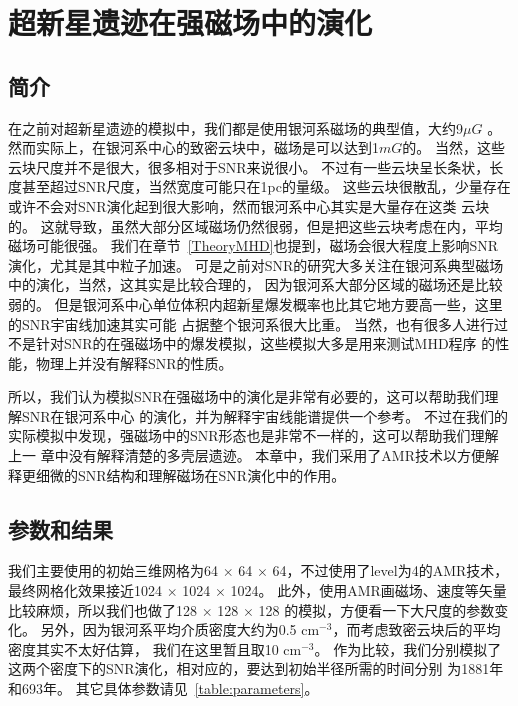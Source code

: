 \chapter{超新星遗迹在强磁场中的演化}
\label{Mag}

\section{简介}
\label{MagIntro}

在之前对超新星遗迹的模拟中，我们都是使用银河系磁场的典型值，大约9$\mu G$
\citep{Crutcher2012,Haverkorn2015}。
然而实际上，在银河系中心的致密云块中，磁场是可以达到1$mG$的\citep{Ferriere2009}。
当然，这些云块尺度并不是很大，很多相对于SNR来说很小。
不过有一些云块呈长条状，长度甚至超过SNR尺度，当然宽度可能只在1pc的量级。
这些云块很散乱，少量存在或许不会对SNR演化起到很大影响，然而银河系中心其实是大量存在这类
云块的。
这就导致，虽然大部分区域磁场仍然很弱，但是把这些云块考虑在内，平均磁场可能很强。
我们在章节~\ref{TheoryMHD}也提到，磁场会很大程度上影响SNR演化，尤其是其中粒子加速。
可是之前对SNR的研究大多关注在银河系典型磁场中的演化，当然，这其实是比较合理的，
因为银河系大部分区域的磁场还是比较弱的。
但是银河系中心单位体积内超新星爆发概率也比其它地方要高一些，这里的SNR宇宙线加速其实可能
占据整个银河系很大比重。
当然，也有很多人进行过不是针对SNR的在强磁场中的爆发模拟，这些模拟大多是用来测试MHD程序
的性能，物理上并没有解释SNR的性质\citep{Balsara1999, Stone2009, Barnes2018}。

所以，我们认为模拟SNR在强磁场中的演化是非常有必要的，这可以帮助我们理解SNR在银河系中心
的演化，并为解释宇宙线能谱提供一个参考。
不过在我们的实际模拟中发现，强磁场中的SNR形态也是非常不一样的，这可以帮助我们理解上一
章中没有解释清楚的多壳层遗迹。
本章中，我们采用了AMR技术以方便解释更细微的SNR结构和理解磁场在SNR演化中的作用。

\section{参数和结果}
\label{MagMod}
我们主要使用的初始三维网格为64 $\times$ 64 $\times$ 64，不过使用了level为4的AMR技术，
最终网格化效果接近1024 $\times$ 1024 $\times$ 1024。
此外，使用AMR画磁场、速度等矢量比较麻烦，所以我们也做了128 $\times$ 128 $\times$ 128
的模拟，方便看一下大尺度的参数变化。
另外，因为银河系平均介质密度大约为0.5 cm$^{-3}$，而考虑致密云块后的平均密度其实不太好估算，
我们在这里暂且取10 cm$^{-3}$。
作为比较，我们分别模拟了这两个密度下的SNR演化，相对应的，要达到初始半径所需的时间分别
为1881年和693年。
其它具体参数请见~\ref{table:parameters}。


